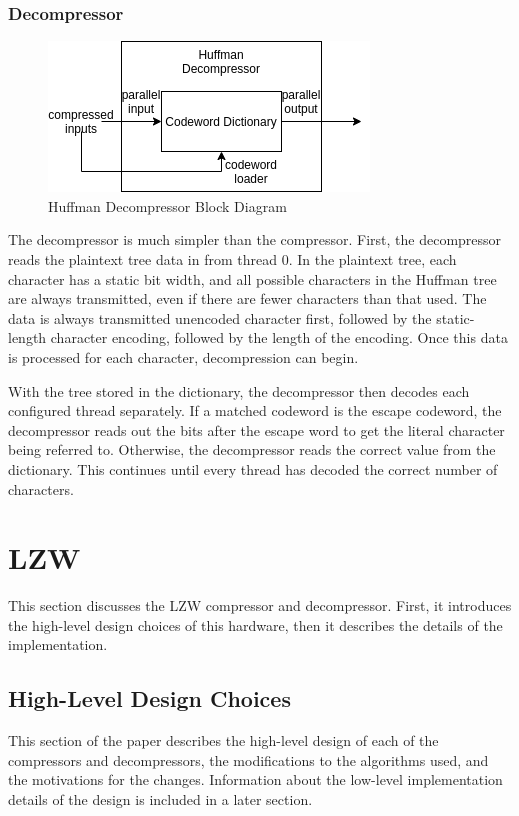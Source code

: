 \documentclass[doublespace,nopageskip]{VTthesis}
\begin{document}
\subsubsection{Decompressor}\label{sss:huffman_decompressor_implementation}

\begin{figure}[htb]
	\centering
	\includegraphics[scale=1]{Huffman Decompressor Block Diagram.png}
	\caption{Huffman Decompressor Block Diagram}
	\label{fig:huffman_decompressor_block_diagram}
\end{figure}

The decompressor is much simpler than the compressor. First, the decompressor reads the plaintext tree data in from thread 0. In the plaintext tree, each character has a static bit width, and all possible characters in the Huffman tree are always transmitted, even if there are fewer characters than that used. The data is always transmitted unencoded character first, followed by the static-length character encoding, followed by the length of the encoding. Once this data is processed for each character, decompression can begin.

With the tree stored in the dictionary, the decompressor then decodes each configured thread separately. If a matched codeword is the escape codeword, the decompressor reads out the bits after the escape word to get the literal character being referred to. Otherwise, the decompressor reads the correct value from the dictionary. This continues until every thread has decoded the correct number of characters.

\section{LZW}\label{ss:lzw}
This section discusses the LZW compressor and decompressor. First, it introduces the high-level design choices of this hardware, then it describes the details of the implementation.

\subsection{High-Level Design Choices}\label{se:high-level_design_choices}
This section of the paper describes the high-level design of each of the compressors and decompressors, the modifications to the algorithms used, and the motivations for the changes. Information about the low-level implementation details of the design is included in a later section.
\end{document}
